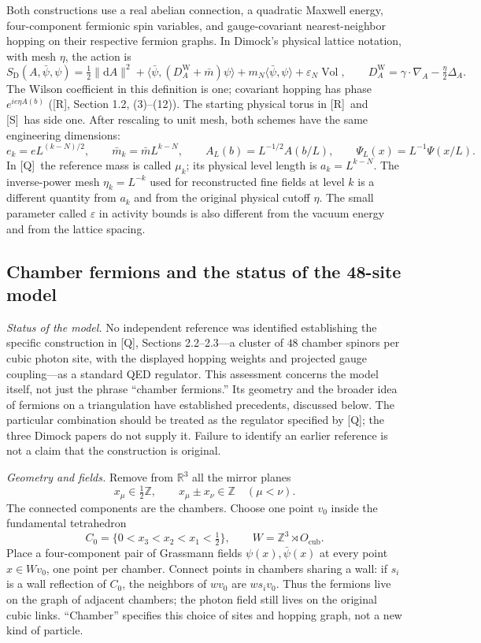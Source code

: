 \documentclass[11pt]{article}
\numberwithin{equation}{section}
\newcommand{\R}{\mathbb R}
\newcommand{\Z}{\mathbb Z}
\newcommand{\dd}{\mathrm d}
\newcommand{\Vol}{\operatorname{Vol}}
\newcommand{\Q}{\textup{[Q]}}
\newcommand{\UR}{\textup{[R]}}
\newcommand{\US}{\textup{[S]}}
\begin{document}
Both constructions use a real abelian connection, a quadratic Maxwell
energy, four-component fermionic spin variables, and gauge-covariant
nearest-neighbor hopping on their respective fermion graphs. In
Dimock's physical lattice notation, with mesh $\eta$, the action is
\begin{equation}
 S_{\mathrm D}(A,\bar\psi,\psi)
 =\tfrac12\|\dd A\|^2
  +\langle\bar\psi,(D_A^{\mathrm W}+\bar m)\psi\rangle
  +m_N\langle\bar\psi,\psi\rangle+\varepsilon_N\Vol,
 \qquad
 D_A^{\mathrm W}=\gamma\cdot\nabla_A-\tfrac\eta2\Delta_A.
 \label{eq:digest-Wilson}
\end{equation}
The Wilson coefficient in this definition is one; covariant hopping
has phase $e^{ie\eta A(b)}$ (\UR, Section 1.2, (3)--(12)).
The starting physical torus in \UR\ and \US\ has side one.
After rescaling to unit mesh, both schemes have the same engineering
dimensions:
\begin{equation}
 e_k=eL^{(k-N)/2},\qquad
 \bar m_k=\bar m L^{k-N},\qquad
 A_L(b)=L^{-1/2}A(b/L),\qquad
 \Psi_L(x)=L^{-1}\Psi(x/L).
 \label{eq:digest-scaling}
\end{equation}
In \Q\ the reference mass is called $\mu_k$; its physical level length
is $a_k=L^{k-N}$. The inverse-power mesh $\eta_k=L^{-k}$ used for
reconstructed fine fields at level $k$ is a different quantity from
$a_k$ and from the original physical cutoff $\eta$.
The small parameter called $\varepsilon$ in activity bounds is also
different from the vacuum energy and from the lattice spacing.

\subsection{Chamber fermions and the status of the 48-site model}

\emph{Status of the model.} No independent reference was identified
establishing the specific construction in \Q, Sections 2.2--2.3---a
cluster of $48$ chamber spinors per cubic photon site, with the
displayed hopping weights and projected gauge coupling---as a
standard QED regulator. This assessment concerns the model itself,
not just the phrase ``chamber fermions.'' Its geometry and the
broader idea of fermions on a triangulation have established
precedents, discussed below. The particular combination should be
treated as the regulator specified by \Q; the three Dimock papers
do not supply it. Failure to identify an earlier reference is not a
claim that the construction is original.

\emph{Geometry and fields.} Remove from $\R^3$ all the mirror planes
\[
 x_\mu\in\tfrac12\Z,\qquad x_\mu\pm x_\nu\in\Z\quad(\mu<\nu).
\]
The connected components are the chambers. Choose one point $v_0$
inside the fundamental tetrahedron
\[
 C_0=\{0<x_3<x_2<x_1<\tfrac12\},
 \qquad W=\Z^3\rtimes O_{\mathrm{cub}}.
\]
Place a four-component pair of Grassmann fields
$\psi(x),\bar\psi(x)$ at every point $x\in Wv_0$, one point per
chamber. Connect points in chambers sharing a wall: if $s_i$ is a
wall reflection of $C_0$, the neighbors of $wv_0$ are $ws_iv_0$.
Thus the fermions live on the graph of adjacent chambers; the photon
field still lives on the original cubic links. ``Chamber'' specifies
this choice of sites and hopping graph, not a new kind of particle.
\end{document}
